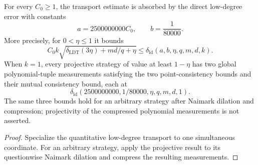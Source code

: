 \begin{theorem}
\label{thm:qld-direct-soundness-explicit}
\leanok
{}
For every $C_0\geq1$, the transport estimate is absorbed by the direct
low-degree error with constants
\[
  a=2500000000C_0,\qquad b=\frac1{80000}.
\]
More precisely, for $0<\eta\leq1$ it bounds
\[
 C_0k\sqrt{\delta_{\mathrm{LDT}}(3\eta)+md/q+\eta}
 \leq\delta_{\mathrm{ld}}(a,b,\eta,q,m,d,k).
\]
When $k=1$, every projective strategy of value at least $1-\eta$ has two
global polynomial-tuple measurements satisfying the two point-consistency
bounds and their mutual consistency bound, each at
\[
 \delta_{\mathrm{ld}}(2500000000,1/80000,\eta,q,m,d,1).
\]
The same three bounds hold for an arbitrary strategy after Naimark dilation
and compression; projectivity of the compressed polynomial measurements is
not asserted.
\end{theorem}
\begin{proof}
\leanok
Specialize the quantitative low-degree transport to one simultaneous
coordinate.  For an arbitrary strategy, apply the projective result to its
questionwise Naimark dilation and compress the resulting measurements.
\end{proof}

